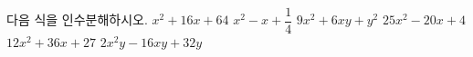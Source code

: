 다음 식을 인수분해하시오.
 $x^2+16x+64$
 $x^2-x+\dfrac{1}{4}$
 $9x^2+6xy+y^2$
 $25x^2-20x+4$
 $12x^2+36x+27$
 $2x^2y-16xy+32y$
